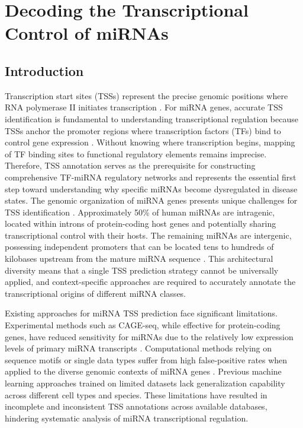 \chapter{Decoding the Transcriptional Control of miRNAs}
\label{chp:decoding-the-transcriptional-control-of}

\section{Introduction}

Transcription start sites (TSSs) represent the precise genomic positions where RNA polymerase II initiates transcription \cite{klooster2016substrat,liu2019predicti}. For miRNA genes, accurate TSS identification is fundamental to understanding transcriptional regulation because TSSs anchor the promoter regions where transcription factors (TFs) bind to control gene expression \cite{lee2004microrna}. Without knowing where transcription begins, mapping of TF binding sites to functional regulatory elements remains imprecise. Therefore, TSS annotation serves as the prerequisite for constructing comprehensive TF-miRNA regulatory networks and represents the essential first step toward understanding why specific miRNAs become dysregulated in disease states. The genomic organization of miRNA genes presents unique challenges for TSS identification \cite{lee2003nuclear}. Approximately 50\% of human miRNAs are intragenic, located within introns of protein-coding host genes and potentially sharing transcriptional control with their hosts. The remaining miRNAs are intergenic, possessing independent promoters that can be located tens to hundreds of kilobases upstream from the mature miRNA sequence \cite{georgaki2014microtss}. This architectural diversity means that a single TSS prediction strategy cannot be universally applied, and context-specific approaches are required to accurately annotate the transcriptional origins of different miRNA classes.

Existing approaches for miRNA TSS prediction face significant limitations. Experimental methods such as CAGE-seq, while effective for protein-coding genes, have reduced sensitivity for miRNAs due to the relatively low expression levels of primary miRNA transcripts \cite{shiraki2003gene}. Computational methods relying on sequence motifs or single data types suffer from high false-positive rates when applied to the diverse genomic contexts of miRNA genes \cite{suzuki2002dbtss}. Previous machine learning approaches trained on limited datasets lack generalization capability across different cell types and species. These limitations have resulted in incomplete and inconsistent TSS annotations across available databases, hindering systematic analysis of miRNA transcriptional regulation.

